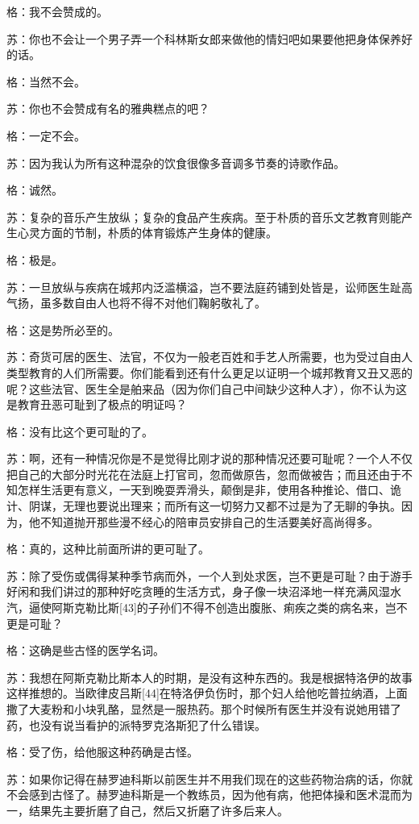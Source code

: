 \documentclass[12pt,oneside]{book}
\begin{document}
格：我不会赞成的。

苏：你也不会让一个男子弄一个科林斯女郎来做他的情妇吧如果要他把身体保养好的话。

格：当然不会。

苏：你也不会赞成有名的雅典糕点的吧？

格：一定不会。

苏：因为我认为所有这种混杂的饮食很像多音调多节奏的诗歌作品。

格：诚然。

苏：复杂的音乐产生放纵；复杂的食品产生疾病。至于朴质的音乐文艺教育则能产生心灵方面的节制，朴质的体育锻炼产生身体的健康。

格：极是。

苏：一旦放纵与疾病在城邦内泛滥横溢，岂不要法庭药铺到处皆是，讼师医生趾高气扬，虽多数自由人也将不得不对他们鞠躬敬礼了。

格：这是势所必至的。

苏：奇货可居的医生、法官，不仅为一般老百姓和手艺人所需要，也为受过自由人类型教育的人们所需要。你们能看到还有什么更足以证明一个城邦教育又丑又恶的呢？这些法官、医生全是舶来品（因为你们自己中间缺少这种人才），你不认为这是教育丑恶可耻到了极点的明证吗？

格：没有比这个更可耻的了。

苏：啊，还有一种情况你是不是觉得比刚才说的那种情况还要可耻呢？一个人不仅把自己的大部分时光花在法庭上打官司，忽而做原告，忽而做被告；而且还由于不知怎样生活更有意义，一天到晚耍弄滑头，颠倒是非，使用各种推论、借口、诡计、阴谋，无理也要说出理来；而所有这一切努力又都不过是为了无聊的争执。因为，他不知道抛开那些漫不经心的陪审员安排自己的生活要美好高尚得多。

格：真的，这种比前面所讲的更可耻了。

苏：除了受伤或偶得某种季节病而外，一个人到处求医，岂不更是可耻？由于游手好闲和我们讲过的那种好吃贪睡的生活方式，身子像一块沼泽地一样充满风湿水汽，逼使阿斯克勒比斯[43]的子孙们不得不创造出腹胀、痢疾之类的病名来，岂不更是可耻？

格：这确是些古怪的医学名词。

苏：我想在阿斯克勒比斯本人的时期，是没有这种东西的。我是根据特洛伊的故事这样推想的。当欧律皮吕斯[44]在特洛伊负伤时，那个妇人给他吃普拉纳酒，上面撒了大麦粉和小块乳酪，显然是一服热药。那个时候所有医生并没有说她用错了药，也没有说当看护的派特罗克洛斯犯了什么错误。

格：受了伤，给他服这种药确是古怪。

苏：如果你记得在赫罗迪科斯以前医生并不用我们现在的这些药物治病的话，你就不会感到古怪了。赫罗迪科斯是一个教练员，因为他有病，他把体操和医术混而为一，结果先主要折磨了自己，然后又折磨了许多后来人。
\end{document}
